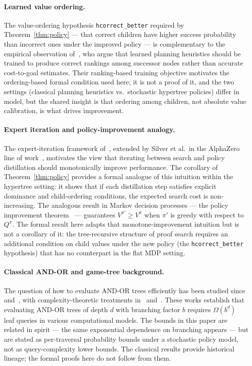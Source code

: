 \documentclass[reqno,11pt]{amsart}
\theoremstyle{plain}
\theoremstyle{definition}
\theoremstyle{remark}
\begin{document}
\paragraph{Learned value ordering.} The value-ordering hypothesis \texttt{hcorrect\_better} required by Theorem~\ref{thm:policy} --- that correct children have higher success probability than incorrect ones under the improved policy --- is complementary to the empirical observation of~\citet{ChrestienEtAl2023}, who argue that learned planning heuristics should be trained to produce correct rankings among successor nodes rather than accurate cost-to-goal estimates. Their ranking-based training objective motivates the ordering-based formal condition used here; it is not a proof of it, and the two settings (classical planning heuristics vs.\ stochastic hypertree policies) differ in model, but the shared insight is that ordering among children, not absolute value calibration, is what drives improvement.

\paragraph{Expert iteration and policy-improvement analogy.} The expert-iteration framework of~\citet{Anthony2017}, extended by Silver et al.\ in the AlphaZero line of work~\citep{Silver2017,Silver2018}, motivates the view that iterating between search and policy distillation should monotonically improve performance. The corollary of Theorem~\ref{thm:policy} provides a formal analogue of this intuition within the hypertree setting: it shows that if each distillation step satisfies explicit dominance and child-ordering conditions, the expected search cost is non-increasing. The analogous result in Markov decision processes --- the policy improvement theorem~\citep{Bellman1957,Puterman1994,SuttonBarto2018} --- guarantees $V^{\pi'} \ge V^{\pi}$ when $\pi'$ is greedy with respect to $Q^\pi$. The formal result here adapts that monotone-improvement intuition but is not a corollary of it: the tree-recursive structure of proof search requires an additional condition on child values under the new policy (the \texttt{hcorrect\_better} hypothesis) that has no counterpart in the flat MDP setting.

\paragraph{Classical AND-OR and game-tree background.} The question of how to evaluate AND-OR trees efficiently has been studied since~\citet{Pearl1982} and~\citet{Tarsi1983}, with complexity-theoretic treatments in~\citet{SaksWigderson1986} and~\citet{Snir1985}. These works establish that evaluating AND-OR trees of depth $d$ with branching factor $b$ requires $\Omega(b^d)$ leaf queries in various computational models. The bounds in this paper are related in spirit --- the same exponential dependence on branching appears --- but are stated as per-traversal probability bounds under a stochastic policy model, not as query-complexity lower bounds. The classical results provide historical lineage; the formal proofs here do not follow from them.
\end{document}
